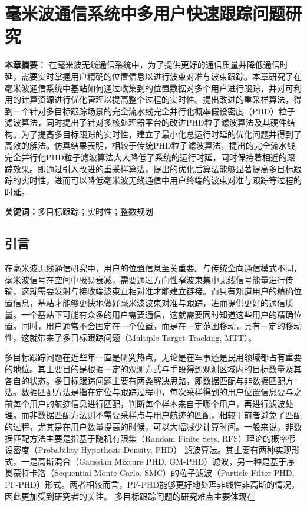 \chapter{毫米波通信系统中多用户快速跟踪问题研究}

\textbf{本章摘要：} 在毫米波无线通信系统中，为了提供更好的通信质量并降低通信时延，需要实时掌握用户精确的位置信息以进行波束对准与波束跟踪。本章研究了在毫米波通信系统中基站如何通过收集到的位置数据对多个用户进行跟踪，并对可利用的计算资源进行优化管理以提高整个过程的实时性。提出改进的重采样算法，得到一个针对多目标跟踪场景的完全流水线完全并行化概率假设密度（PHD）粒子滤波算法，同时提出了针对多核处理器平台的改进PHD粒子滤波算法及其硬件结构。为了提高多目标跟踪的实时性，建立了最小化总运行时延的优化问题并得到了高效的解法。仿真结果表明，相较于传统PHD粒子滤波算法，提出的完全流水线完全并行化PHD粒子滤波算法大大降低了系统的运行时延，同时保持着相近的跟踪效果。即通过引入改进的重采样算法，提出的优化后算法能够显著提高多目标跟踪的实时性，进而可以降低毫米波无线通信中用户终端的波束对准与跟踪等过程的时延。

\textbf{关键词：}多目标跟踪；实时性；整数规划

\section{引言}

在毫米波无线通信研究中，用户的位置信息至关重要。与传统全向通信模式不同，毫米波信号在空间中极易衰减，需要通过方向性窄波束集中无线信号能量进行传输，这就需要发射与接收端波束互相对准才能建立链接。而只有知道用户的精确位置信息，基站才能够更快地做好毫米波波束对准与跟踪，进而提供更好的通信质量。一个基站下可能有众多的用户需要通信，这就需要同时知道这些用户的精确位置。同时，用户通常不会固定在一个位置，而是在一定范围移动，具有一定的移动性，这就带来了多目标跟踪问题（Multiple Target Tracking, MTT）。

多目标跟踪问题在近些年一直是研究热点，无论是在军事还是民用领域都占有重要的地位。其主要目的是根据一定的观测方式与手段得到观测区域内的目标数量及其各自的状态。多目标跟踪问题主要有两类解决思路，即数据匹配与非数据匹配方法。数据匹配方法是指在定位与跟踪过程中，每次采样得到的用户位置信息要与之前每个用户的航迹信息进行匹配，判断每个样本来自于哪个用户，再进行滤波处理。而非数据匹配方法则不需要采样点与用户航迹的匹配，相较于前者避免了匹配的过程，尤其是在用户数量提高的时候，可以大幅减少计算时间。一般来说，非数据匹配方法主要是指基于随机有限集（Random Finite Sets, RFS）理论的概率假设密度（Probability Hypothesis Density, PHD） 滤波算法。其主要有两种实现形式，一是高斯混合（Gaussian Mixture PHD, GM-PHD）滤波\cite{vo2006gaussian,clark2007convergence}，另一种是基于序贯蒙特卡洛\cite{vo2003sequential}（Sequential Monte Carlo, SMC）的粒子滤波（Particle Filter PHD, PF-PHD）形式。两者相较而言，PF-PHD能够更好地处理非线性非高斯的情况，因此更加受到研究者的关注。
多目标跟踪问题的研究难点主要体现在

